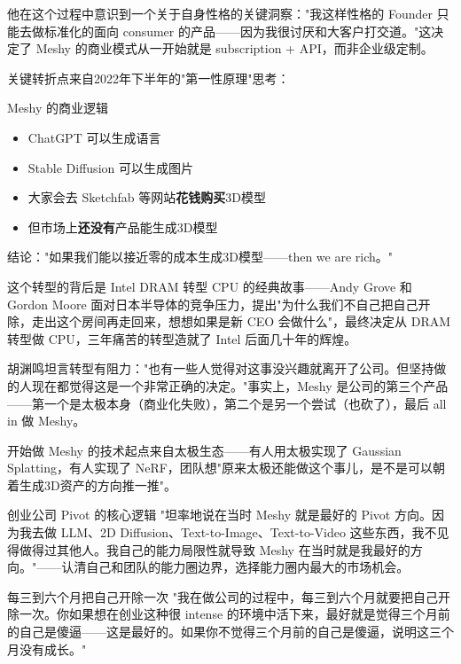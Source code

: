 \documentclass[a4paper]{article}
\begin{document}
他在这个过程中意识到一个关于自身性格的关键洞察："我这样性格的 Founder 只能去做标准化的面向 consumer 的产品——因为我很讨厌和大客户打交道。"这决定了 Meshy 的商业模式从一开始就是 subscription + API，而非企业级定制。

关键转折点来自2022年下半年的"第一性原理"思考：

\begin{importantbox}{Meshy 的商业逻辑}
\begin{itemize}
\item ChatGPT 可以生成语言
\item Stable Diffusion 可以生成图片
\item 大家会去 Sketchfab 等网站\textbf{花钱购买}3D模型
\item 但市场上\textbf{还没有}产品能生成3D模型
\end{itemize}
结论："如果我们能以接近零的成本生成3D模型——then we are rich。"
\end{importantbox}

这个转型的背后是 Intel DRAM 转型 CPU 的经典故事——Andy Grove 和 Gordon Moore 面对日本半导体的竞争压力，提出"为什么我们不自己把自己开除，走出这个房间再走回来，想想如果是新 CEO 会做什么"，最终决定从 DRAM 转型做 CPU，三年痛苦的转型造就了 Intel 后面几十年的辉煌。

胡渊鸣坦言转型有阻力："也有一些人觉得对这事没兴趣就离开了公司。但坚持做的人现在都觉得这是一个非常正确的决定。"事实上，Meshy 是公司的第三个产品——第一个是太极本身（商业化失败），第二个是另一个尝试（也砍了），最后 all in 做 Meshy。

开始做 Meshy 的技术起点来自太极生态——有人用太极实现了 Gaussian Splatting，有人实现了 NeRF，团队想"原来太极还能做这个事儿，是不是可以朝着生成3D资产的方向推一推"。

\begin{importantbox}{创业公司 Pivot 的核心逻辑}
"坦率地说在当时 Meshy 就是最好的 Pivot 方向。因为我去做 LLM、2D Diffusion、Text-to-Image、Text-to-Video 这些东西，我不见得做得过其他人。我自己的能力局限性就导致 Meshy 在当时就是我最好的方向。"——认清自己和团队的能力圈边界，选择能力圈内最大的市场机会。
\end{importantbox}

\begin{importantbox}{每三到六个月把自己开除一次}
"我在做公司的过程中，每三到六个月就要把自己开除一次。你如果想在创业这种很 intense 的环境中活下来，最好就是觉得三个月前的自己是傻逼——这是最好的。如果你不觉得三个月前的自己是傻逼，说明这三个月没有成长。"
\end{importantbox}
\end{document}
